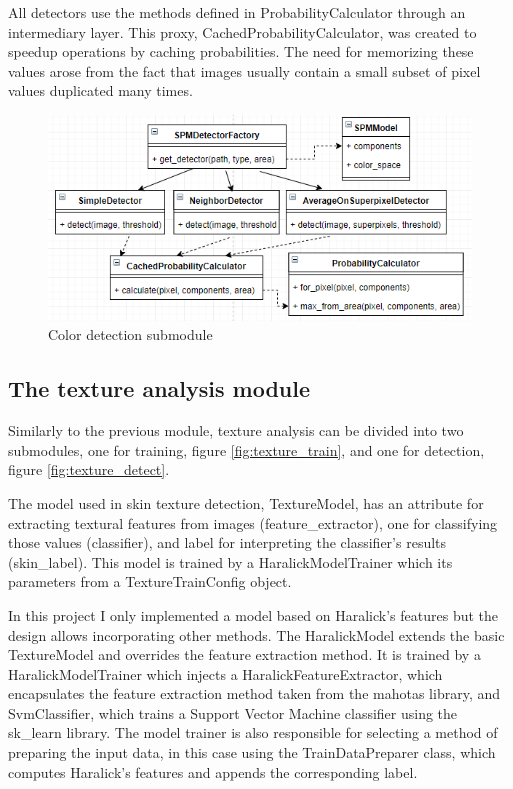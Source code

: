 \documentclass[12pt]{report}
\begin{document}
	All detectors use the methods defined in ProbabilityCalculator through an intermediary layer. This proxy, CachedProbabilityCalculator, was created to speedup operations by caching probabilities. The need for memorizing these values arose from the fact that images usually contain a small subset of pixel values duplicated many times.
	
	\begin{figure}[h!]
		\centering
		\includegraphics[]{design/color_detect.png}
		\caption{Color detection submodule}
		\label{fig:color_detect}
	\end{figure}
	
	\subsection{The texture analysis module}
	Similarly to the previous module, texture analysis can be divided into two submodules, one for training, figure \ref{fig:texture_train}, and one for detection, figure \ref{fig:texture_detect}.
	
	The model used in skin texture detection, TextureModel, has an attribute for extracting textural features from images (feature\_extractor), one for classifying those values (classifier), and label for interpreting the classifier's results (skin\_label). This model is trained by a HaralickModelTrainer which its parameters from a TextureTrainConfig object.
	
	In this project I only implemented a model based on Haralick's features but the design allows incorporating other methods. The HaralickModel extends the basic TextureModel and overrides the feature extraction method. It is trained by a HaralickModelTrainer which injects a HaralickFeatureExtractor, which encapsulates the feature extraction method taken from the mahotas library, and SvmClassifier, which trains a Support Vector Machine classifier using the sk\_learn library. The model trainer is also responsible for selecting a method of preparing the input data, in this case using the TrainDataPreparer class, which computes Haralick's features and appends the corresponding label.
	
\end{document}
